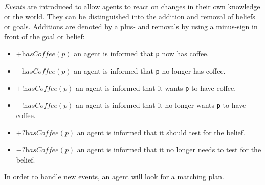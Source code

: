 \emph{Events} are introduced to allow agents to react on changes in their own knowledge or the world. They can be distinguished into the addition and removal of beliefs or goals. Additions are denoted by a plus- and removals by using a minus-sign in front of the goal or belief: %
\begin{itemize} %
  \item $+\textit{hasCoffee}(p)$ an agent is informed that \texttt{p} now has coffee.
  \item $-\textit{hasCoffee}(p)$ an agent is informed that \texttt{p} no longer has coffee.
  \item $+!\textit{hasCoffee}(p)$ an agent is informed that it wants \texttt{p} to have coffee.
  \item $-!\textit{hasCoffee}(p)$ an agent is informed that it no longer wants \texttt{p} to have coffee.
  \item $+?\textit{hasCoffee}(p)$ an agent is informed that it should test for the belief.
  \item $-?\textit{hasCoffee}(p)$ an agent is informed that it no longer needs to test for the belief.
\end{itemize}
In order to handle new events, an agent will look for a matching plan.


